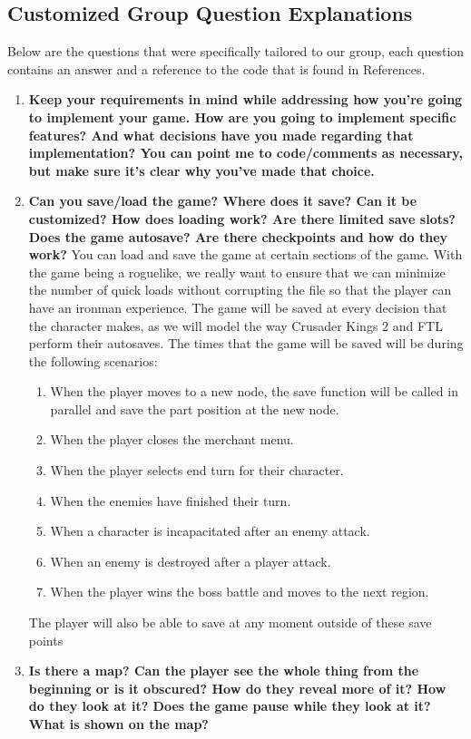 \documentclass[12pt, titlepage]{article}
\begin{document}
\subsection{Customized Group Question Explanations}
\quad Below are the questions that were specifically tailored to our group, each question contains an answer and a reference to the code that is found in References.
\begin{enumerate}
	\item \textbf{Keep your requirements in mind while addressing how you're going to implement your game. How are you going to implement specific features? And what decisions have you made regarding that implementation? You can point me to code/comments as necessary, but make sure it's clear why you've made that choice.}
	\item \textbf{Can you save/load the game? Where does it save? Can it be customized? How does loading work? Are there limited save slots? Does the game autosave? Are there checkpoints and how do they work?}
	You can load and save the game at certain sections of the game. With the game being a roguelike, we really want to ensure that we can minimize the number of quick loads without corrupting the file so that the player can have an ironman experience. The game will be saved at every decision that the character makes, as we will model the way Crusader Kings 2 and FTL perform their autosaves. The times that the game will be saved will be during the following scenarios:
	\begin{enumerate}
	\item When the player moves to a new node, the save function will be called in parallel and save the part position at the new node.
	\item When the player closes the merchant menu.
	\item When the player selects end turn for their character.
	\item When the enemies have finished their turn.
	\item When a character is incapacitated after an enemy attack.
	\item When an enemy is destroyed after a player attack.
	\item When the player wins the boss battle and moves to the next region. 
	\end{enumerate}
	The player will also be able to save at any moment outside of these save points
	\item \textbf{Is there a map? Can the player see the whole thing from the beginning or is it obscured? How do they reveal more of it? How do they look at it? Does the game pause while they look at it? What is shown on the map?}

\end{enumerate}
\end{document}

